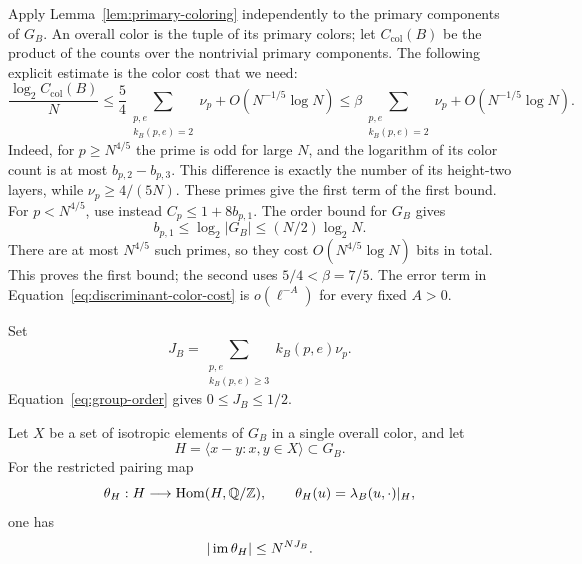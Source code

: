 Apply Lemma~\ref{lem:primary-coloring} independently to the primary
components of \(G_B\). An overall color is the tuple of its primary
colors; let \(C_{\mathrm{col}}(B)\) be the product of the counts over
the nontrivial primary components.
The following explicit estimate is the color cost that we need:
\begin{equation}\label{eq:discriminant-color-cost}
 \frac{\log_2 C_{\mathrm{col}}(B)}{N}
 \le \frac54\sum_{\substack{p,e\\k_B(p,e)=2}}\nu_p
       +O(N^{-1/5}\log N)
 \le \beta\sum_{\substack{p,e\\k_B(p,e)=2}}\nu_p
       +O(N^{-1/5}\log N).
\end{equation}
Indeed, for \(p\ge N^{4/5}\) the prime is odd for large \(N\), and
the logarithm of its color count is at most \(b_{p,2}-b_{p,3}\).
This difference is exactly the number of its height-two layers,
while \(\nu_p\ge4/(5N)\). These primes give the first term of the
first bound. For \(p<N^{4/5}\), use instead
\(C_p\le1+8b_{p,1}\). The order bound for \(G_B\) gives
\[
 b_{p,1}\le\log_2|G_B|\le (N/2)\log_2N.
\]
There are at most \(N^{4/5}\) such primes, so they cost
\(O(N^{4/5}\log N)\) bits in total. This proves the first bound;
the second uses \(5/4<\beta=7/5\). The error term in
Equation~\eqref{eq:discriminant-color-cost} is
\(o(\ell^{-A})\) for every fixed \(A>0\).

Set
\begin{equation}\label{eq:discriminant-high-weight}
 J_B=\sum_{\substack{p,e\\k_B(p,e)\ge3}}k_B(p,e)\nu_p.
\end{equation}
Equation~\eqref{eq:group-order} gives \(0\le J_B\le1/2\).

\begin{lemma}\label{lem:colored-image-order}
Let \(X\) be a set of isotropic elements of \(G_B\) in a single
overall color, and let
\[
 H=\langle x-y:x,y\in X\rangle\subset G_B.
\]
For the restricted pairing map
\[
 \theta_H:H\longrightarrow\operatorname{Hom}(H,\mathbb Q/\mathbb Z),\qquad
 \theta_H(u)=\lambda_B(u,\cdot)|_H,
\]
one has
\[
 |\operatorname{im}\theta_H|\le N^{NJ_B}.
\]
\end{lemma}

